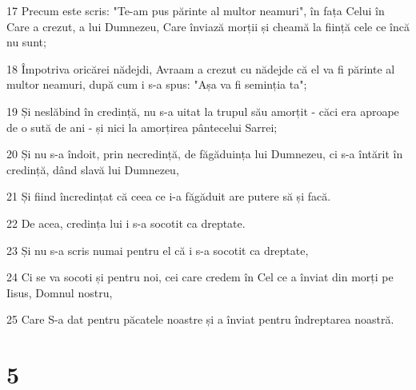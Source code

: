 \par 17 Precum este scris: "Te-am pus părinte al multor neamuri", în fața Celui în Care a crezut, a lui Dumnezeu, Care înviază morții și cheamă la ființă cele ce încă nu sunt;
\par 18 Împotriva oricărei nădejdi, Avraam a crezut cu nădejde că el va fi părinte al multor neamuri, după cum i s-a spus: "Așa va fi seminția ta";
\par 19 Și neslăbind în credință, nu s-a uitat la trupul său amorțit - căci era aproape de o sută de ani - și nici la amorțirea pântecelui Sarrei;
\par 20 Și nu s-a îndoit, prin necredință, de făgăduința lui Dumnezeu, ci s-a întărit în credință, dând slavă lui Dumnezeu,
\par 21 Și fiind încredințat că ceea ce i-a făgăduit are putere să și facă.
\par 22 De acea, credința lui i s-a socotit ca dreptate.
\par 23 Și nu s-a scris numai pentru el că i s-a socotit ca dreptate,
\par 24 Ci se va socoti și pentru noi, cei care credem în Cel ce a înviat din morți pe Iisus, Domnul nostru,
\par 25 Care S-a dat pentru păcatele noastre și a înviat pentru îndreptarea noastră.

\chapter{5}


